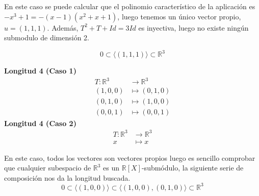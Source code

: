En este caso se puede calcular que el polinomio característico de la aplicación
es \(-x^3 + 1 = -(x-1)(x^2+x+1)\), luego tenemos un único vector propio, \(u = (1,1,1)\). Además, \(T^2 + T +Id = 3Id\) es inyectiva, luego no existe ningún submodulo de dimensión 2.

\[
        0 \subset \langle (1,1,1) \rangle \subset \mathbb{R}^3
\]

\textbf{Longitud 4 (Caso 1)}%
\[
\begin{aligned}
  T:\mathbb{R}^3 &\rightarrow \mathbb{R}^3\\
  (1,0,0) &\mapsto (0,1,0)\\
  (0,1,0) &\mapsto (1,0,0)\\
  (0,0,1) &\mapsto (0,0,1)
\end{aligned}
\]
\textbf{Longitud 4 (Caso 2)}%
\[
\begin{aligned}
  T:\mathbb{R}^3 &\rightarrow \mathbb{R}^3\\
  x &\mapsto x
\end{aligned}
\]

En este caso, todos los vectores son vectores propios luego es sencillo comprobar que cualquier subespacio de \(\mathbb{R}^3\) es un
\(\mathbb{R}[X]\)-submódulo, la siguiente serie de composición nos da la longitud buscada.
\[
        0 \subset \langle (1,0,0) \rangle \subset \langle (1,0,0), (0,1,0)
        \rangle \subset \mathbb{R}^3
\]

